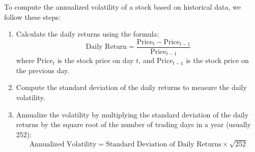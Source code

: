 To compute the annualized volatility of a stock based on historical data, we follow these steps:
\begin{enumerate}
    \item Calculate the daily returns using the formula:
    \[
    \text{Daily Return} = \frac{\text{Price}_t - \text{Price}_{t-1}}{\text{Price}_{t-1}}
    \]
    where $\text{Price}_t$ is the stock price on day $t$, and $\text{Price}_{t-1}$ is the stock price on the previous day.
    
    \item Compute the standard deviation of the daily returns to measure the daily volatility.
    
    \item Annualize the volatility by multiplying the standard deviation of the daily returns by the square root of the number of trading days in a year (usually 252):
    \[
    \text{Annualized Volatility} = \text{Standard Deviation of Daily Returns} \times \sqrt{252}
    \]
\end{enumerate}